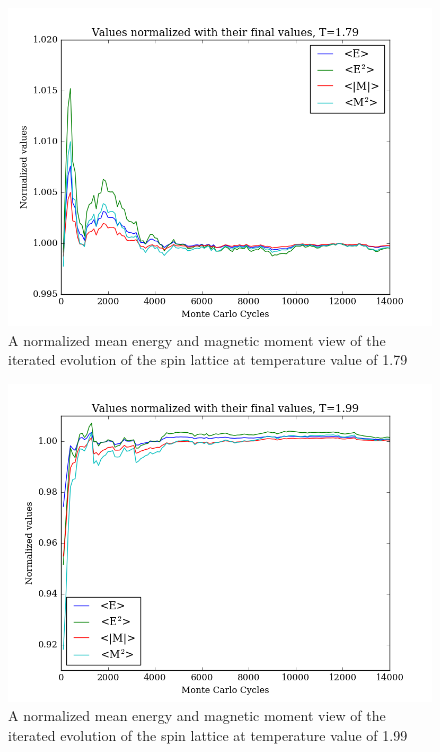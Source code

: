 \documentclass[11pt,a4paper,notitlepage,twocolumn]{article}
\begin{document}
\begin{figure}
[H]\center
\includegraphics[scale=0.35]{../figs/4c/Prob_L20_mc100000_T179_spinup.png}
\caption{A normalized mean energy and magnetic moment view of the iterated evolution of the spin lattice at temperature value of 1.79}
\end{figure}
\begin{figure}
[H]\center
\includegraphics[scale=0.35]{../figs/4c/Prob_L20_mc100000_T199_spinup.png}
\caption{A normalized mean energy and magnetic moment view of the iterated evolution of the spin lattice at temperature value of 1.99}
\end{figure}
\end{document}

